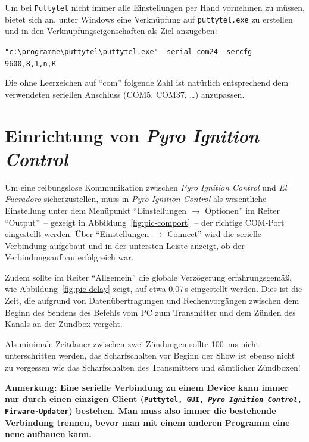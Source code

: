 \documentclass[paper=a4, parskip, numbers=noenddot, toc=listof, headsepline]{scrbook}
\newcommand{\pic}{\emph{Pyro Ignition Control}}
\newcommand{\anlage}{\emph{El Fueradoro}}
\begin{document}
			Um bei \texttt{Puttytel} nicht immer alle Einstellungen per Hand vornehmen zu müssen, bietet sich an, unter Windows eine Verknüpfung auf \texttt{puttytel.exe} zu erstellen und in den Ver\-knüpfungs\-eigen\-schaften als Ziel anzugeben:
			\begin{center}
				\verb|"c:\programme\puttytel\puttytel.exe" -serial com24 -sercfg 9600,8,1,n,R|
			\end{center}

			Die ohne Leerzeichen auf \enquote{com} folgende Zahl ist natürlich entsprechend dem verwendeten seriellen Anschluss (COM5, COM37, \dots) anzupassen.

		\section{Einrichtung von \pic}
			\label{sec:piceinrichtung}

			Um eine reibungslose Kommunikation zwischen {\pic} und {\anlage} sicherzustellen, muss in {\pic} als wesentliche Einstellung unter dem Menüpunkt \enquote{Einstellungen $\rightarrow$ Optionen} im Reiter \enquote{Output}~-- gezeigt in Abbildung~\ref{fig:pic-comport}~-- der richtige COM-Port eingestellt werden. Über \enquote{Einstellungen $\rightarrow$ Connect} wird die serielle Verbindung aufgebaut und in der untersten Leiste anzeigt, ob der Verbindungsaufbau erfolgreich war.

			Zudem sollte im Reiter \enquote{Allgemein} die globale Verzögerung erfahrungsgemäß, wie Abbildung~\ref{fig:pic-delay} zeigt, auf etwa 0,07\,s eingestellt werden. Dies ist die Zeit, die aufgrund von Datenübertragungen und Rechenvorgängen zwischen dem Beginn des Sendens des Befehls vom PC zum Transmitter und dem Zünden des Kanals an der Zündbox vergeht.

			Als minimale Zeitdauer zwischen zwei Zündungen sollte \SI{100}{\milli\second} nicht unterschritten werden, das Scharfschalten vor Beginn der Show ist ebenso nicht zu vergessen wie das Scharfschalten des Transmitters und sämtlicher Zündboxen!

			\textbf{Anmerkung: Eine serielle Verbindung zu einem Device kann immer nur durch einen einzigen Client (\texttt{Putty\-tel, GUI, {\pic}, Firware-Updater}) bestehen. Man muss also immer die bestehende Verbindung trennen, bevor man mit einem anderen Programm eine neue aufbauen kann.}
\end{document}
